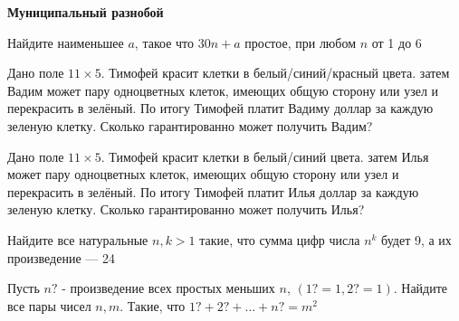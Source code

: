 \documentclass{article}
\begin{document}
    \large

    \begin{center}
        \textbf{Муниципальный разнобой}
    \end{center}

    \begin{enumerate_boxed}

        \item Найдите наименьшее $a$, такое что $30n + a$ простое, при любом $n$ от 1 до 6

        \item Дано поле $11 \times 5$.
        Тимофей красит клетки в белый/синий/красный цвета.
        затем Вадим может пару одноцветных клеток, имеющих общую сторону или узел и перекрасить в зелёный.
        По итогу Тимофей платит Вадиму доллар за каждую зеленую клетку.
        Сколько гарантированно может получить Вадим?

        \item Дано поле $11 \times 5$.
        Тимофей красит клетки в белый/синий цвета.
        затем Илья может пару одноцветных клеток, имеющих общую сторону или узел и перекрасить в зелёный.
        По итогу Тимофей платит Илья доллар за каждую зеленую клетку.
        Сколько гарантированно может получить Илья?

        \item Найдите все натуральные $n, k > 1$ такие, что сумма цифр числа $n^k$ будет 9, а их произведение --- 24

        \item Пусть $n?$ - произведение всех простых меньших $n$, $(1? = 1, 2? = 1)$.
        Найдите все пары чисел $n, m$.
        Такие, что $1? + 2? + \dotsc + n? = m^2$

    \end{enumerate_boxed}
\end{document}
